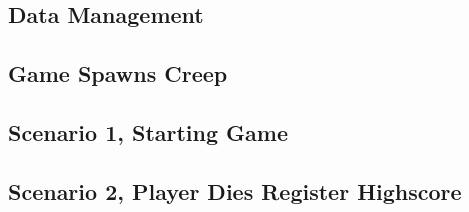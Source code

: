 \subsection{Data Management}


\subsection{Game Spawns Creep}
	


\subsection{Scenario 1, Starting Game}


\subsection{Scenario 2, Player Dies Register Highscore}

